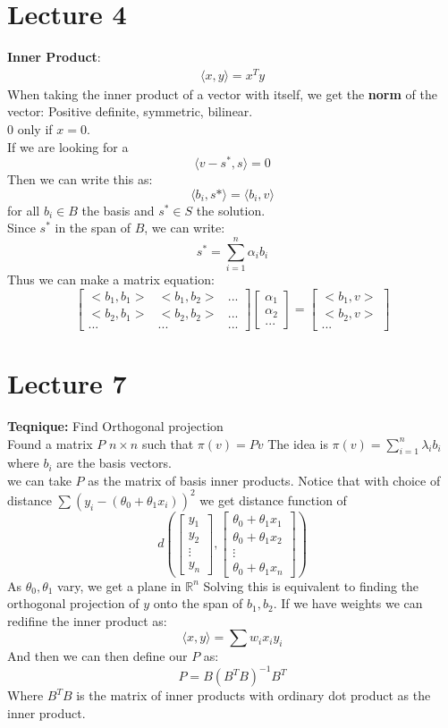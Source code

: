 \documentclass[answers,12pt,addpoints]{exam}
\begin{document}
\section*{Lecture 4}
\textbf{Inner Product}:
\begin{align*}
    \langle x, y \rangle = x^Ty
\end{align*}
When taking the inner product of a vector with itself, we get the \textbf{norm} of the vector: Positive definite, symmetric, bilinear.\\
$0$ only if $x = 0$.\\
If we are looking for a 
$$ \langle v - s^* , s \rangle = 0$$
Then we can write this as:
$$ \langle b_i , s* \rangle = \langle b_i ,v \rangle$$
for all $b_i \in B$ the basis and $s^* \in S$ the solution.\\
Since $s^*$ in the span of $B$, we can write: 
$$ s^* = \sum_{i=1}^n \alpha_i b_i$$
Thus we can make a matrix equation:
$$ \begin{bmatrix}
    <b_1, b_1> & <b_1, b_2> & ...\\
    <b_2, b_1> & <b_2, b_2> & ...\\
    ... & ... & ...
\end{bmatrix}
\begin{bmatrix}
    \alpha_1\\
    \alpha_2\\
    ...
\end{bmatrix}
=
\begin{bmatrix}
    <b_1, v>\\
    <b_2, v>\\
    ...
\end{bmatrix}$$
\section*{Lecture 7}
\textbf{Teqnique:} Find Orthogonal projection\\
Found a matrix $P$ $n \times n$ such that $\pi(v) = Pv$ 
The idea is $\pi(v) = \sum_{i=1}^n \lambda_i b_i$ where $b_i$ are the basis vectors.\\
we can take $P$ as the matrix of basis inner products.
Notice that with choice of distance $\sum ( y_i - (\theta_0 + \theta_1 x_i))^2$ we get distance function of\\
$$ d(\begin{bmatrix}
    y_1\\
    y_2\\
    \vdots\\
    y_n
\end{bmatrix} , \begin{bmatrix}
    \theta_0 + \theta_1 x_1\\
    \theta_0 + \theta_1 x_2\\
    \vdots\\
    \theta_0 + \theta_1 x_n
\end{bmatrix})$$
As $\theta_0, \theta_1$ vary, we get a plane in $\mathbb{R}^n$
Solving this is equivalent to finding the orthogonal projection of $y$ onto the span of $b_1, b_2$.
If we have weights we can redifine the inner product as:
$$ \langle x, y \rangle = \sum w_i x_i y_i$$
And then we can then define our $P$ as:
$$ P = B(B^T B)^{-1}B^T$$
Where $B^T B$ is the matrix of inner products with ordinary dot product as the inner product.
\end{document}
